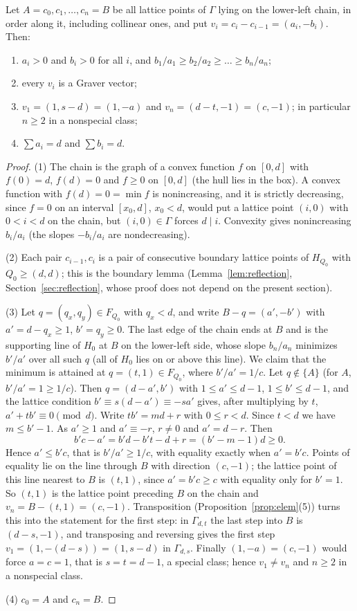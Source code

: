 \begin{lemma}\label{lem:chain0}
Let $A=c_0,c_1,\dots,c_n=B$ be all lattice points of $\Gamma$ lying on the lower-left chain, in order along it, including collinear ones, and put $v_i=c_i-c_{i-1}=(a_i,-b_i)$. Then:
\begin{enumerate}
\item $a_i>0$ and $b_i>0$ for all $i$, and $b_1/a_1\ge b_2/a_2\ge\dots\ge b_n/a_n$;
\item every $v_i$ is a Graver vector;
\item $v_1=(1,s-d)=(1,-a)$ and $v_n=(d-t,-1)=(c,-1)$; in particular $n\ge2$ in a nonspecial class;
\item $\sum a_i=d$ and $\sum b_i=d$.
\end{enumerate}
\end{lemma}
\begin{proof}
(1) The chain is the graph of a convex function $f$ on $[0,d]$ with $f(0)=d$, $f(d)=0$ and $f\ge0$ on $[0,d]$ (the hull lies in the box). A convex function with $f(d)=0=\min f$ is nonincreasing, and it is strictly decreasing, since $f=0$ on an interval $[x_0,d]$, $x_0<d$, would put a lattice point $(i,0)$ with $0<i<d$ on the chain, but $(i,0)\in\Gamma$ forces $d\mid i$. Convexity gives nonincreasing $b_i/a_i$ (the slopes $-b_i/a_i$ are nondecreasing).

(2) Each pair $c_{i-1},c_i$ is a pair of consecutive boundary lattice points of $H_{Q_0}$ with $Q_0\ge(d,d)$; this is the boundary lemma (Lemma~\ref{lem:reflection}, Section~\ref{sec:reflection}, whose proof does not depend on the present section).

(3) Let $q=(q_x,q_y)\in F_{Q_0}$ with $q_x<d$, and write $B-q=(a',-b')$ with $a'=d-q_x\ge1$, $b'=q_y\ge0$. The last edge of the chain ends at $B$ and is the supporting line of $H_0$ at $B$ on the lower-left side, whose slope $b_n/a_n$ minimizes $b'/a'$ over all such $q$ (all of $H_0$ lies on or above this line). We claim that the minimum is attained at $q=(t,1)\in F_{Q_0}$, where $b'/a'=1/c$. Let $q\notin\{A\}$ (for $A$, $b'/a'=1\ge1/c$). Then $q=(d-a',b')$ with $1\le a'\le d-1$, $1\le b'\le d-1$, and the lattice condition $b'\equiv s(d-a')\equiv-sa'$ gives, after multiplying by $t$, $a'+tb'\equiv0\pmod d$. Write $tb'=md+r$ with $0\le r<d$. Since $t<d$ we have $m\le b'-1$. As $a'\ge1$ and $a'\equiv-r$, $r\neq0$ and $a'=d-r$. Then
\[
  b'c-a'=b'd-b't-d+r=(b'-m-1)d\ge0.
\]
Hence $a'\le b'c$, that is $b'/a'\ge1/c$, with equality exactly when $a'=b'c$. Points of equality lie on the line through $B$ with direction $(c,-1)$; the lattice point of this line nearest to $B$ is $(t,1)$, since $a'=b'c\ge c$ with equality only for $b'=1$. So $(t,1)$ is the lattice point preceding $B$ on the chain and $v_n=B-(t,1)=(c,-1)$. Transposition (Proposition~\ref{prop:elem}(5)) turns this into the statement for the first step: in $\Gamma_{d,t}$ the last step into $B$ is $(d-s,-1)$, and transposing and reversing gives the first step $v_1=(1,-(d-s))=(1,s-d)$ in $\Gamma_{d,s}$. Finally $(1,-a)=(c,-1)$ would force $a=c=1$, that is $s=t=d-1$, a special class; hence $v_1\ne v_n$ and $n\ge2$ in a nonspecial class.

(4) $c_0=A$ and $c_n=B$.
\end{proof}

